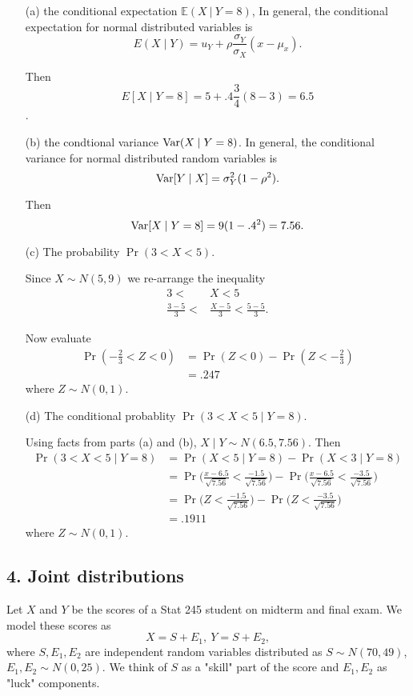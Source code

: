 \documentclass{tufte-book}
\begin{document}
\begin{enumerate}

\item[(a)] the conditional expectation $\mathbb{E}(X \ | \ Y=8)$,
In general, the conditional expectation for normal distributed variables is
\[ E(X \mid Y) = u_Y + \rho \frac{\sigma_Y}{\sigma_X}(x-\mu_x). \]

Then
\[ E[X \mid Y=8 ] = 5 + .4\frac{3}{4}(8-3) = 6.5 \].

\item[(b)] the condtional variance $\operatorname{Var}(X \mid Y=8)$.
In general, the conditional variance for normal distributed random variables is
\[ \operatorname{Var}[Y \mid X] = \sigma_Y^2(1-\rho^2). \]

Then
\[ \operatorname{Var}[X \mid Y=8] = 9(1-.4^2) = 7.56. \]

\item[(c)] The probability $\Pr(3 < X < 5)$.

Since $X \sim N(5,9)$ we re-arrange the inequality
\begin{align*}
3 <& X < 5\\
\frac{3-5}{3} <& \frac{X-5}{3} < \frac{5-5}{3}.
\end{align*}

Now evaluate
\begin{align*}
\Pr(-\frac{2}{3} < Z < 0 ) &= \Pr(Z < 0) - \Pr(Z<-\frac{2}{3}) \\
&= .247
\end{align*}
where $Z \sim N(0,1)$.

\item[(d)]The conditional probablity $\Pr(3<X<5 \mid Y=8)$.

Using facts from parts (a) and (b), $X\mid Y \sim N(6.5, 7.56)$.  Then
\begin{align*}
\Pr(3<X<5 \mid Y=8) &= \Pr(X<5 \mid Y=8) - \Pr(X<3 \mid Y=8)\\
&= \Pr\Big( \frac{x-6.5}{\sqrt{7.56}} < \frac{-1.5}{\sqrt{7.56}}\Big) - \Pr\Big(\frac{x-6.5}{\sqrt{7.56}} < \frac{-3.5}{\sqrt{7.56}}\Big) \\
&= \Pr\Big( Z < \frac{-1.5}{\sqrt{7.56}}\Big) - \Pr\Big(Z < \frac{-3.5}{\sqrt{7.56}}\Big)\\
&= .1911
\end{align*}
where $Z \sim N(0,1)$.
\end{enumerate}

\subsection{4. Joint distributions}
Let $X$ and $Y$ be the scores of a Stat 245 student on midterm and final exam.  We model these scores as
\[ X=S+E_1, \ Y=S+E_2, \]
where $S, E_1, E_2$ are independent random variables distributed as $S \sim N(70,49)$, $E_1,E_2 \sim N(0,25)$.  We think of $S$ as a "skill" part of the score and $E_1, E_2$ as "luck" components.
\end{document}
